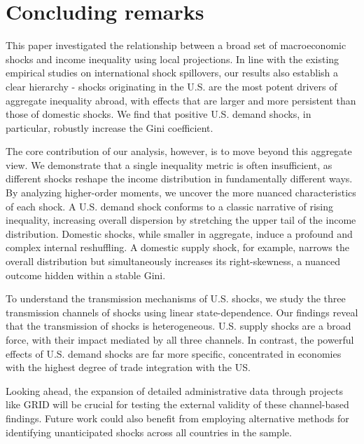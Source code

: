 \documentclass[12pt, a4paper]{article}
\begin{document}
\newpage
\section{Concluding remarks}
This paper investigated the relationship between a broad set of macroeconomic shocks and income inequality using local projections. In line with the existing empirical studies on international shock spillovers, our results also establish a clear hierarchy - shocks originating in the U.S. are the most potent drivers of aggregate inequality abroad, with effects that are larger and more persistent than those of domestic shocks. We find that positive U.S. demand shocks, in particular, robustly increase the Gini coefficient.

The core contribution of our analysis, however, is to move beyond this aggregate view. We demonstrate that a single inequality metric is often insufficient, as different shocks reshape the income distribution in fundamentally different ways. By analyzing higher-order moments, we uncover the more nuanced characteristics of each shock. A U.S. demand shock conforms to a classic narrative of rising inequality, increasing overall dispersion by stretching the upper tail of the income distribution. Domestic shocks, while smaller in aggregate, induce a profound and complex internal reshuffling. A domestic supply shock, for example, narrows the overall distribution but simultaneously increases its right-skewness, a nuanced outcome hidden within a stable Gini.

To understand the transmission mechanisms of U.S. shocks, we study the three transmission channels of shocks using linear state-dependence. Our findings reveal that the transmission of shocks is heterogeneous. U.S. supply shocks are a broad force, with their impact mediated by all three channels. In contrast, the powerful effects of U.S. demand shocks are far more specific, concentrated in economies with the highest degree of trade integration with the US.

Looking ahead, the expansion of detailed administrative data through projects like GRID will be crucial for testing the external validity of these channel-based findings. Future work could also benefit from employing alternative methods for identifying unanticipated shocks across all countries in the sample.

\newpage
\printbibliography
\pagebreak
\end{document}
